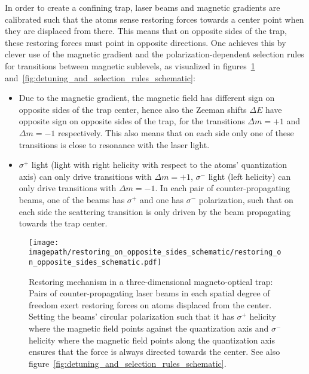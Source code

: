 In order to create a confining trap, laser beams and magnetic gradients are calibrated such that the atoms sense restoring forces towards a center point when they are displaced from there. This means that on opposite sides of the trap, these restoring forces must point in opposite directions. One achieves this by clever use of the magnetic gradient and the polarization-dependent selection rules for transitions between magnetic sublevels, as visualized in figures~\ref{fig:restoring_on_opposite_sides_schematic} and~\ref{fig:detuning_and_selection_rules_schematic}:
\begin{itemize}
    \item Due to the magnetic gradient, the magnetic field has different sign on opposite sides of the trap center, hence also the Zeeman shifts $\Delta E$ have opposite sign on opposite sides of the trap, for the transitions $\Delta m = +1$ and $\Delta m = -1$ respectively. This also means that on each side only one of these transitions is close to resonance with the laser light.
    \item $\sigma^+$ light (light with right helicity with respect to the atoms' quantization axis) can only drive transitions with $\Delta m = +1$, $\sigma^-$ light (left helicity) can only drive transitions with $\Delta m = -1$. In each pair of counter-propagating beams, one of the beams has $\sigma^+$ and one has $\sigma^-$ polarization, such that on each side the scattering transition is only driven by the beam propagating towards the trap center.
\end{itemize}

\begin{figure}
    \centering
    \texttt{[image: \\imagepath/restoring\_on\_opposite\_sides\_schematic/restoring\_on\_opposite\_sides\_schematic.pdf]}
    \caption{Restoring mechanism in a three-dimensional magneto-optical trap: Pairs of counter-propagating laser beams in each spatial degree of freedom exert restoring forces on atoms displaced from the center. Setting the beams' circular polarization such that it has $\sigma^+$ helicity where the magnetic field points against the quantization axis and $\sigma^-$ helicity where the magnetic field points along the quantization axis ensures that the force is always directed towards the center. See also figure~\ref{fig:detuning_and_selection_rules_schematic}.}
    \label{fig:restoring_on_opposite_sides_schematic}
\end{figure} 

